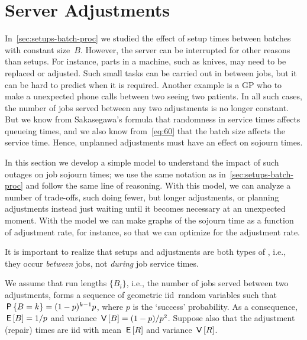 


\section{Server Adjustments}
\label{sec:non-preempt-interr}


In~\cref{sec:setups-batch-proc} we studied the effect of setup times between batches with constant size~$B$.
However, the server can be interrupted for other reasons than setups.
For instance, parts in a machine, such as knives, may need to be replaced or adjusted.
Such small tasks can be carried out in between jobs, but it can be hard to predict when it is required.
Another example is a GP who  to make a unexpected phone calls between two seeing two patients.
In all such cases, the number of jobs
served between any two adjustments
is no longer constant.
But we know from Sakasegawa's formula that randomness in service times affects queueing times, and we also know from~\cref{eq:60} that the batch size affects the service time.
Hence, unplanned adjustments must have an effect on sojourn times.


In this section we develop a simple model to understand the impact of such outages on job sojourn times; we use the same notation as in~\cref{sec:setups-batch-proc} and follow the same line of reasoning.
With this model, we can analyze a number of trade-offs, such doing fewer, but longer adjustments, or planning adjustments instead just waiting until it becomes necessary at an unexpected moment. With the model we can make graphs of the sojourn time as a function of adjustment rate, for instance, so that we can optimize for the adjustment rate.

It is important to realize that setups and adjustments are both types of , i.e., they occur \emph{between} jobs, not \emph{during}  job service times. 




We assume that run lengths $\{B_i\}$, i.e., the number of jobs served between two adjustments, forms a sequence of geometric iid\ random variables such that $\P{B=k} = (1-p)^{k-1}p$, where $p$ is the `success' probability.
As a consequence, $\E B=1/p$ and variance $\V B = (1-p)/p^2$. Suppose also that the adjustment (repair) times are iid with mean $\E R$ and variance $\V R$.

